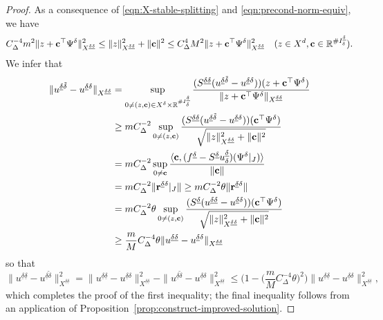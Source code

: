 \documentclass[11pt,a4paper,oneside,english]{amsart}
\numberwithin{equation}{section}
\numberwithin{theorem}{section}
\theoremstyle{definition}
\newcommand{\R}{\mathbb{R}}
\newcommand{\udelta}{{\underline{\delta}}}
\newcommand{\jw}[1]{{\color{red}{JW: #1}}}
\begin{document}
\begin{proof}
  As a consequence of \eqref{eqn:X-stable-splitting} and \eqref{eqn:precond-norm-equiv}, we have
  \[
    C_\Delta^{-4} m^2 \|z+{\bf c}^\top \Psi^\delta\|_{X^{\udelta \udelta}}^2
    \leq
    \|z\|_{X^{\udelta \udelta}}^2+ \|{\bf c}\|^2
    \leq
    C_\Delta^{4} M^2 \|z+{\bf c}^\top \Psi^\delta\|_{X^{\udelta \udelta}}^2 \quad (z \in X^d, {\bf c} \in \R^{\# I_\delta^\udelta}).
  \]
  We infer that
  \begin{align*}
    \|u^{\udelta \tilde{\delta}}-u^{\udelta \delta}\|_{X^{\udelta \udelta}}&=\sup_{0 \neq (z,{\bf c}) \in X^\delta \times \R^{\# I_\delta^\udelta}}
    \frac{(S^{\udelta \udelta}(u^{\udelta \tilde{\delta}}-u^{\udelta \delta}))(z+{\bf c}^\top \Psi^\delta)}{\|z+{\bf c}^\top \Psi^\delta\|_{X^{\udelta \udelta}}}\\
    & \geq m C_\Delta^{-2}  \sup_{0 \neq (z,{\bf c})}
    \frac{(S^{\udelta \udelta}(u^{\udelta \tilde{\delta}}-u^{\udelta \delta}))({\bf c}^\top \Psi^\delta)}{\sqrt{\|z\|_{X^{\udelta \udelta}}^2+\|{\bf c}\|^2}}\\
    & =m C_\Delta^{-2} \sup_{0 \neq {\bf c}}
    \frac{\langle {\bf c},(f^\udelta -S^\udelta u_{\delta}^\udelta)(\Psi^\delta|_J)\rangle}{\|{\bf c}\|}\\
    &=m C_\Delta^{-2} \|{\bf r}^{\udelta \delta}|_J\|  \geq m C_\Delta^{-2} \theta \|{\bf r}^{\udelta \delta}\|\\
    & =m C_\Delta^{-2} \theta \sup_{0 \neq (z,{\bf c})}
    \frac{(S^\udelta(u^{\udelta \udelta}-u^{\udelta \delta}))({\bf c}^\top \Psi^\delta)}{\sqrt{\|z\|_{X^{\udelta \udelta}}^2+\|{\bf c}\|^2}}\\
    & \geq \frac{m}{M} C_\Delta^{-4} \theta
    \|u^{\udelta \udelta}-u^{\udelta \delta}\|_{X^{\udelta \udelta}}
  \end{align*}
  so that
  \[
    \|u^{\udelta \udelta}-u^{\udelta \tilde{\delta}}\|_{X^{\udelta \udelta}}^2=
    \|u^{\udelta \udelta}-u^{\udelta \delta}\|_{X^{\udelta \udelta}}^2-
    \|u^{\udelta \tilde{\delta}}-u^{\udelta \delta}\|_{X^{\udelta \udelta}}^2
    \leq \Big(1-\big(\frac{m}{M} C_\Delta^{-4} \theta\big)^2\Big) \|u^{\udelta \udelta}-u^{\udelta \delta}\|_{X^{\udelta \udelta}}^2,
  \]
  which completes the proof of the first inequality; the final inequality follows
  from an application of Proposition~\ref{prop:construct-improved-solution}.
  \jw{dit bewijs ben ik nog niet nagegaan}
\end{proof}
\end{document}
